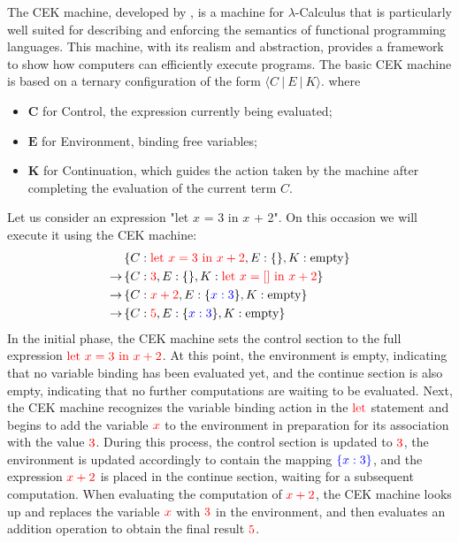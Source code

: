 \documentclass{l4proj}
\begin{document}
The CEK machine, developed by \cite{felleisen_1986_control}, is a machine for $\lambda$-Calculus that is particularly well suited for describing and enforcing the semantics of functional programming languages. This machine, with its realism and abstraction, provides a framework to show how computers can efficiently execute programs. The basic CEK machine is based on a ternary configuration of the form $⟨C\:|\:E\:|\:K⟩$. where
\begin{itemize}
    \item $\textbf{C}$ for Control, the expression currently being evaluated;
    \item $\textbf{E}$ for Environment, binding free variables;
    \item $\textbf{K}$ for Continuation, which guides the action taken by the machine after completing the evaluation of the current term $C$.
\end{itemize}
Let us consider an expression "let $x$ = 3 in $x$ + 2". On this occasion we will execute it using the CEK machine:
\begin{align*}
& \left\{C: \textcolor{red}{\text{let } x = 3 \text{ in } x + 2}, E: \{\}, K: \text{empty}\right\} \\
\rightarrow & \left\{C: \textcolor{red}{3}, E: \{\}, K: \textcolor{red}{\text{let } x = [] \text{ in } x + 2}\right\} \\
\rightarrow & \left\{C: \textcolor{red}{x + 2}, E: \{\textcolor{blue}{x: 3}\}, K: \text{empty}\right\} \\
\rightarrow & \left\{C: \textcolor{red}{5}, E: \{\textcolor{blue}{x: 3}\}, K: \text{empty}\right\}
\end{align*}
In the initial phase, the CEK machine sets the control section to the full expression $\color{red}{\text{let } x = 3 \text{ in } x + 2}$. At this point, the environment is empty, indicating that no variable binding has been evaluated yet, and the continue section is also empty, indicating that no further computations are waiting to be evaluated. Next, the CEK machine recognizes the variable binding action in the $\color{red}{\text{let}}$ statement and begins to add the variable $\color{red}{x}$ to the environment in preparation for its association with the value $\color{red}{3}$. During this process, the control section is updated to $\color{red}{3}$, the environment is updated accordingly to contain the mapping $\color{blue}{\{x: 3\}}$, and the expression $\color{red}{x + 2}$ is placed in the continue section, waiting for a subsequent computation. When evaluating the computation of $\color{red}{x + 2}$, the CEK machine looks up and replaces the variable $\color{red}{x}$ with $\color{red}{3}$ in the environment, and then evaluates an addition operation to obtain the final result $\color{red}{5}$.
\end{document}
